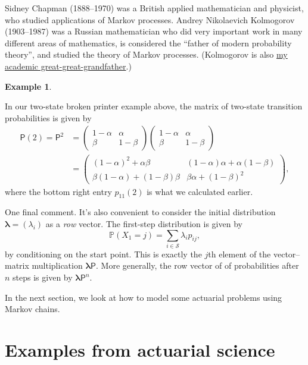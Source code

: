 \documentclass[
  a4paper,
]{article}
\theoremstyle{definition}
\theoremstyle{definition}
\newtheorem{example}{Example}[section]
\theoremstyle{definition}
\theoremstyle{remark}
\begin{document}
Sidney Chapman (1888--1970) was a British applied mathematician and physicist, who studied applications of Markov processes. Andrey Nikolaevich Kolmogorov (1903--1987) was a Russian mathematician who did very important work in many different areas of mathematics, is considered the ``father of modern probability theory'', and studied the theory of Markov processes. (Kolmogorov is also \href{https://genealogy.math.ndsu.nodak.edu/id.php?id=53569}{my academic great-great-grandfather}.)

\begin{example}
\protect\hypertarget{exm:printer2}{}\label{exm:printer2}

In our two-state broken printer example above, the matrix of two-state transition probabilities is given by
\begin{align*}
\mathsf P(2) = \mathsf P^2 &=  \begin{pmatrix} 1-\alpha & \alpha \\ \beta & 1-\beta \end{pmatrix}  \begin{pmatrix} 1-\alpha & \alpha \\ \beta & 1-\beta \end{pmatrix} \\
&=  \begin{pmatrix} (1-\alpha)^2 + \alpha\beta & (1-\alpha)\alpha + \alpha(1-\beta) \\ \beta(1-\alpha) + (1-\beta)\beta & \beta\alpha + (1-\beta)^2 \end{pmatrix} ,
\end{align*}
where the bottom right entry \(p_{11}(2)\) is what we calculated earlier.

\end{example}

One final comment. It's also convenient to consider the initial distribution \(\boldsymbol\lambda = (\lambda_i)\) as a \emph{row} vector. The first-step distribution is given by
\[ \mathbb P(X_1 = j) = \sum_{i \in \mathcal S} \lambda_i p_{ij} , \]
by conditioning on the start point.
This is exactly the \(j\)th element of the vector--matrix multiplication \(\boldsymbol\lambda \mathsf P\). More generally, the row vector of of probabilities after \(n\) steps is given by \(\boldsymbol\lambda \mathsf P^n\).

In the next section, we look at how to model some actuarial problems using Markov chains.

\hypertarget{S06-examples}{%
\section{Examples from actuarial science}\label{S06-examples}}
\end{document}

